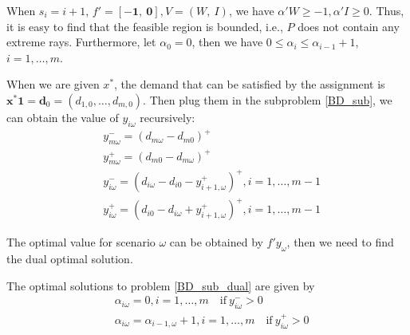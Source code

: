 \begin{corollary}
  When $s_i = i+1$, $f{'} = [-\mathbf{1},~\mathbf{0}], V =(W,~I)$, we have $\alpha{'}W \geq -1, \alpha{'}I \geq 0$. Thus, it is easy to find that the feasible region is bounded, i.e., $P$ does not contain any extreme rays. Furthermore, let $\alpha_0 = 0$, then we have $0 \leq \alpha_i \leq \alpha_{i-1} +1$, $i = 1, \ldots, m$.

\end{corollary}


When we are given $x^{*}$, the demand that can be satisfied by the assignment is $\mathbf{x}^{*} \mathbf{1} = \mathbf{d}_0 = (d_{1,0},\ldots,d_{m,0})$.
Then plug them in the subproblem \eqref{BD_sub}, we can obtain the value of $y_{i \omega}$ recursively:
\begin{equation}\label{y_recursively}
\begin{aligned}
  & y_{m \omega}^{-}=\left(d_{m \omega}-d_{m 0}\right)^{+} \\
  & y_{m \omega}^{+}=\left(d_{m 0}-d_{m \omega}\right)^{+} \\
  & y_{i \omega}^{-}=\left(d_{i \omega}-d_{i 0} - y_{i+1, \omega}^{+} \right)^{+}, i =1,\ldots,m-1 \\
  & y_{i \omega}^{+}=\left(d_{i 0}- d_{i \omega} + y_{i+1, \omega}^{+}\right)^{+}, i =1,\ldots,m-1
\end{aligned}
\end{equation}

The optimal value for scenario $\omega$ can be obtained by $f{'} y_{\omega}$, then we need to find the dual optimal solution.


\begin{thm}\label{optimal_sol_sub_dual}
  The optimal solutions to problem \eqref{BD_sub_dual} are given by 
\begin{equation}\label{BD_sub_simplified}
  \begin{aligned}
    & \alpha_{i \omega} =0, i =1,\ldots,m \quad \text{if}~  y_{i \omega}^{-} > 0   \\
    & \alpha_{i \omega} = \alpha_{i-1, \omega}+1, i =1,\ldots,m \quad \text{if}~ y_{i \omega}^{+} > 0
  \end{aligned}
\end{equation}
\end{thm}

